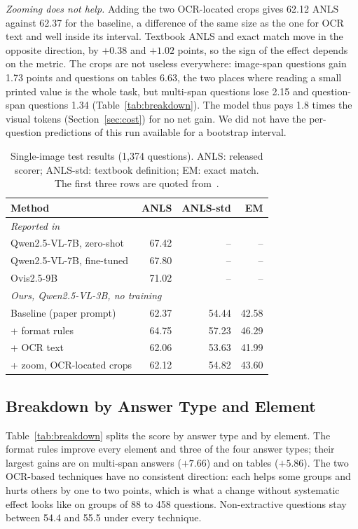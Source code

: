 \documentclass[conference]{IEEEtran}
\begin{document}
\emph{Zooming does not help.} Adding the two OCR-located crops gives 62.12 ANLS against 62.37 for the baseline, a difference of the same size as the one for OCR text and well inside its interval. Textbook ANLS and exact match move in the opposite direction, by $+0.38$ and $+1.02$ points, so the sign of the effect depends on the metric. The crops are not useless everywhere: image-span questions gain 1.73 points and questions on tables 6.63, the two places where reading a small printed value is the whole task, but multi-span questions lose 2.15 and question-span questions 1.34 (Table~\ref{tab:breakdown}). The model thus pays 1.8 times the visual tokens (Section~\ref{sec:cost}) for no net gain. We did not have the per-question predictions of this run available for a bootstrap interval.

\begin{table}[t]
\caption{Single-image test results (1{,}374 questions). ANLS: released scorer; ANLS-std: textbook definition; EM: exact match. The first three rows are quoted from~\cite{viinfographicvqa}.}
\label{tab:main}
\centering
\begin{tabular}{lrrr}
\toprule
Method & ANLS & ANLS-std & EM \\
\midrule
\multicolumn{4}{l}{\textit{Reported in~\cite{viinfographicvqa}}} \\
Qwen2.5-VL-7B, zero-shot   & 67.42 & -- & -- \\
Qwen2.5-VL-7B, fine-tuned  & 67.80 & -- & -- \\
Ovis2.5-9B                 & 71.02 & -- & -- \\
\midrule
\multicolumn{4}{l}{\textit{Ours, Qwen2.5-VL-3B, no training}} \\
Baseline (paper prompt)          & 62.37 & 54.44 & 42.58 \\
+ format rules                   & 64.75 & 57.23 & 46.29 \\
+ OCR text                       & 62.06 & 53.63 & 41.99 \\
+ zoom, OCR-located crops        & 62.12 & 54.82 & 43.60 \\
\bottomrule
\end{tabular}
\end{table}

\subsection{Breakdown by Answer Type and Element}
Table~\ref{tab:breakdown} splits the score by answer type and by element. The format rules improve every element and three of the four answer types; their largest gains are on multi-span answers ($+7.66$) and on tables ($+5.86$). The two OCR-based techniques have no consistent direction: each helps some groups and hurts others by one to two points, which is what a change without systematic effect looks like on groups of 88 to 458 questions. Non-extractive questions stay between 54.4 and 55.5 under every technique.
\end{document}
